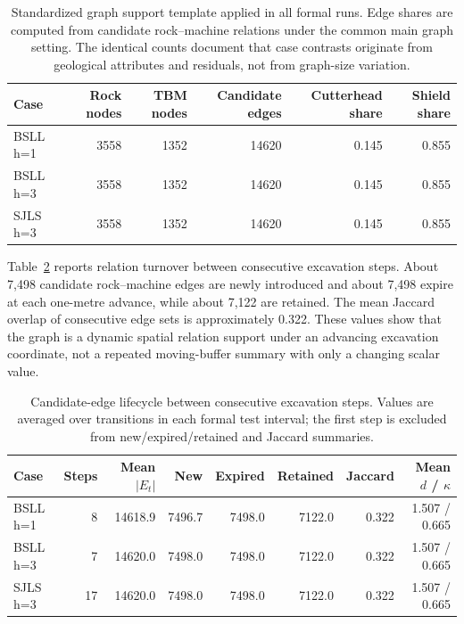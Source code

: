 \begin{table}[htbp]
\centering
\caption{Standardized graph support template applied in all formal runs. Edge
shares are computed from candidate rock--machine relations under the common
main graph setting. The identical counts document that case contrasts originate
from geological attributes and residuals, not from graph-size variation.}
\label{tab:graph_construction_stats}
\scriptsize
\setlength{\tabcolsep}{4pt}
\begin{tabular}{lrrrrr}
\toprule
Case & Rock nodes & TBM nodes & Candidate edges & Cutterhead share & Shield share \\
\midrule
BSLL h=1 & 3558 & 1352 & 14620 & 0.145 & 0.855 \\
BSLL h=3 & 3558 & 1352 & 14620 & 0.145 & 0.855 \\
SJLS h=3 & 3558 & 1352 & 14620 & 0.145 & 0.855 \\
\bottomrule
\end{tabular}
\end{table}

Table~\ref{tab:edge_lifecycle} reports relation turnover between consecutive
excavation steps. About 7,498 candidate rock--machine edges are newly
introduced and about 7,498 expire at each one-metre advance, while about 7,122
are retained. The mean Jaccard overlap of consecutive edge sets is
approximately 0.322. These values show that the graph is a dynamic spatial
relation support under an advancing excavation coordinate, not a repeated
moving-buffer summary with only a changing scalar value.

\begin{table}[htbp]
\centering
\caption{Candidate-edge lifecycle between consecutive excavation steps. Values
are averaged over transitions in each formal test interval; the first step is
excluded from new/expired/retained and Jaccard summaries.}
\label{tab:edge_lifecycle}
\scriptsize
\setlength{\tabcolsep}{3pt}
\begin{tabular}{lrrrrrrr}
\toprule
Case & Steps & Mean $|E_t|$ & New & Expired & Retained & Jaccard & Mean $d$ / $\kappa$ \\
\midrule
BSLL h=1 & 8 & 14618.9 & 7496.7 & 7498.0 & 7122.0 & 0.322 & 1.507 / 0.665 \\
BSLL h=3 & 7 & 14620.0 & 7498.0 & 7498.0 & 7122.0 & 0.322 & 1.507 / 0.665 \\
SJLS h=3 & 17 & 14620.0 & 7498.0 & 7498.0 & 7122.0 & 0.322 & 1.507 / 0.665 \\
\bottomrule
\end{tabular}
\end{table}

